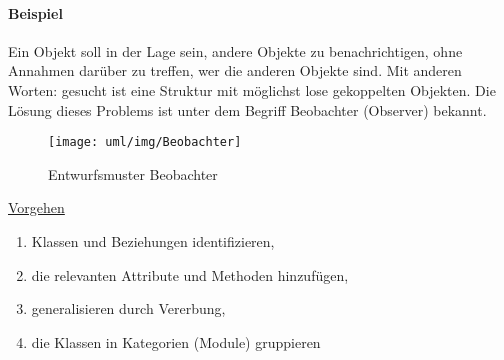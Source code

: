 \begin{minipage}[c]{0.45\linewidth}
\paragraph{Beispiel}
Ein Objekt soll in der Lage sein, andere Objekte zu benachrichtigen,
ohne Annahmen dar\"uber zu treffen, wer die anderen Objekte sind.
Mit anderen Worten: gesucht ist eine Struktur mit
 möglichst lose gekoppelten Objekten.
Die L\"osung dieses Problems ist unter dem Begriff
Beobachter (Observer) bekannt.
%
\begin{figure}[H]
\begin{center}
\texttt{[image: uml/img/Beobachter]}
\caption{Entwurfsmuster Beobachter}
\end{center}
\end{figure}
\fi
%
\ifslides
\newpage
\fi
\underline{Vorgehen}
\begin{enumerate}
\item Klassen und Beziehungen identifizieren,
\item die relevanten Attribute und Methoden hinzuf\"ugen,
\item generalisieren durch Vererbung,
\item die Klassen in Kategorien (Module) gruppieren
\end{enumerate}
\newpage

\end{minipage}
